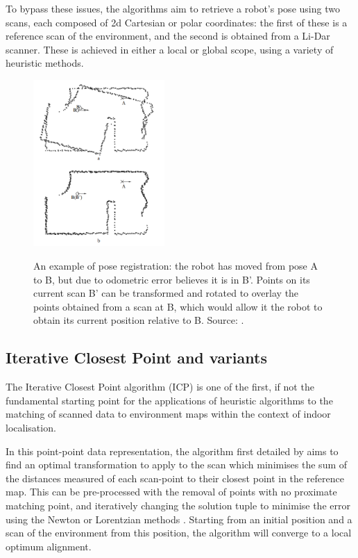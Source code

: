 \documentclass[authoryearcitations]{UoYCSproject}
\begin{document}
To bypass these issues, the algorithms aim to retrieve a robot's pose using two scans, each composed of 2d Cartesian or polar coordinates: the first of these is a reference scan of the environment, and the second is obtained from a Li-Dar scanner. These is achieved in either a local or global scope, using a variety of heuristic methods.
\begin{figure}[t]
	\centering
	\includegraphics[width=5cm,keepaspectratio]{images/pose_estimation.png}
	\label{fig:pose_estimation}
	\caption[An example of pose registration]{An example of pose registration: the robot has moved from pose A to B, but due to odometric error believes it is in B'. Points on its current scan B' can be transformed and rotated to overlay the points obtained from a scan at B, which would allow it the robot to obtain its current position relative to B. Source: \citet{Lu1997-zv}.}
\end{figure}

\subsection{Iterative Closest Point and variants}
\label{subsec:ICP}
The Iterative Closest Point algorithm (ICP) is one of the first, if not the fundamental starting point for the applications of heuristic algorithms to the matching of scanned data to environment maps within the context of indoor localisation.

In this point-point data representation, the algorithm first detailed by \citet{Besl1992-pd} aims to find an optimal transformation to apply to the scan which minimises the sum of the distances measured of each scan-point to their closest point in the reference map. This can be pre-processed with the removal of points with no proximate matching point, and iteratively changing the solution tuple to minimise the error using the Newton or Lorentzian methods \cite{Munoz2005-gt}. Starting from an initial position and a scan of the environment from this position, the algorithm will converge to a local optimum alignment. 
\end{document}
